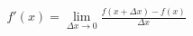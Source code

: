 \documentclass[preview]{standalone}
\begin{document}
\begin{align*}
f'(x) = \lim_{\Delta x \to 0} \frac{f(x+\Delta x) - f(x)}{\Delta x}
\end{align*}
\end{document}
